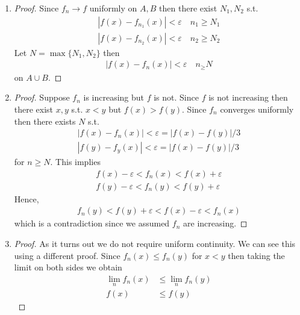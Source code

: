 \begin{enumerate}[label=(\alph*)]
    \item
    \begin{proof}
        Since $f_n\rightarrow f$ uniformly on $A,B$ then 
        there exist $N_1, N_2$ s.t. 
        \begin{gather*}
            |f(x)-f_{n_1}(x)| < \varepsilon \quad n_1\geq N_1 \\
            |f(x)-f_{n_2}(x)| < \varepsilon \quad n_2\geq N_2
        \end{gather*}
        Let $N=\max\{N_1, N_2\}$ then 
        \begin{align*}
            |f(x)-f_{n}(x)| < \varepsilon \quad n_\geq N
        \end{align*}
        on $A\cup B$.
    \end{proof}

    \item
    \begin{proof}
        Suppose $f_n$ is increasing but $f$ is not. Since $f$
        is not increasing then there exist $x,y$ s.t. $x<y$
        but $f(x)>f(y)$. Since $f_n$ converges uniformly then 
        there exists $N$ s.t. 
        \begin{align*}
            |f(x)-f_{n}(x)| < \varepsilon = |f(x)-f(y)|/3 \\
            |f(y)-f_{y}(x)| < \varepsilon = |f(x)-f(y)|/3
        \end{align*}
        for $n\geq N$. This implies 
        \begin{gather*}
            f(x)-\varepsilon < f_n(x) < f(x)+\varepsilon \\
            f(y)-\varepsilon < f_n(y) < f(y)+\varepsilon
        \end{gather*}
        Hence, 
        \begin{align*}
            f_n(y) < f(y)+\varepsilon < f(x)-\varepsilon<f_n(x)
        \end{align*}
        which is a contradiction since we assumed $f_n$ are 
        increasing.
    \end{proof}

    \item
    \begin{proof}
        As it turns out we do not require uniform continuity. 
        We can see this using a different proof.
        Since $f_n(x)\leq f_n(y)$ for $x<y$ then taking the 
        limit on both sides we obtain 
        \begin{align*}
            \lim_n f_n(x) &\leq \lim_n f_n(y) \\
            f(x) &\leq f(y)
        \end{align*}
    \end{proof}
\end{enumerate}

